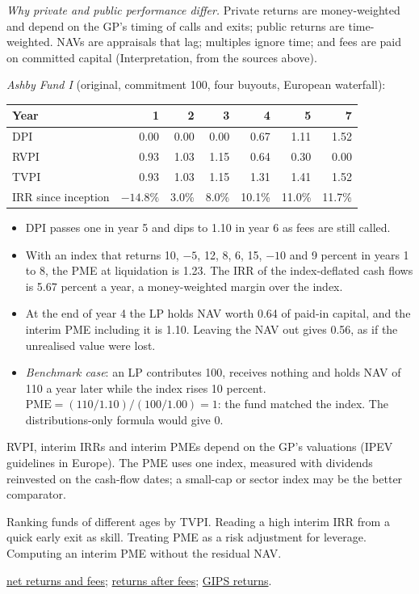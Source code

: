 \begin{qfmethod}
\emph{Why private and public performance differ.} Private returns are money-weighted and depend on the GP's timing of calls and exits; public returns are time-weighted. NAVs are appraisals that lag; multiples ignore time; and fees are paid on committed capital (Interpretation, from the sources above).

 \emph{Ashby Fund I} (original, commitment 100, four buyouts, European waterfall):
\begin{center}\small
\begin{tabular}{@{}lrrrrrr@{}}
\toprule
Year & 1 & 2 & 3 & 4 & 5 & 7 \\
\midrule
DPI & 0.00 & 0.00 & 0.00 & 0.67 & 1.11 & 1.52 \\
RVPI & 0.93 & 1.03 & 1.15 & 0.64 & 0.30 & 0.00 \\
TVPI & 0.93 & 1.03 & 1.15 & 1.31 & 1.41 & 1.52 \\
IRR since inception & $-14.8\%$ & 3.0\% & 8.0\% & 10.1\% & 11.0\% & 11.7\% \\
\bottomrule
\end{tabular}
\end{center}
\begin{itemize}
\item DPI passes one in year 5 and dips to 1.10 in year 6 as fees are still called.
\item With an index that returns 10, $-5$, 12, 8, 6, 15, $-10$ and 9 percent in years 1 to 8, the PME at liquidation is 1.23. The IRR of the index-deflated cash flows is 5.67 percent a year, a money-weighted margin over the index.
\item At the end of year 4 the LP holds NAV worth 0.64 of paid-in capital, and the interim PME including it is 1.10. Leaving the NAV out gives 0.56, as if the unrealised value were lost.
\item \emph{Benchmark case}: an LP contributes 100, receives nothing and holds NAV of 110 a year later while the index rises 10 percent. $\mathrm{PME}=(110/1.10)/(100/1.00)=1$: the fund matched the index. The distributions-only formula would give 0.
\end{itemize}

 RVPI, interim IRRs and interim PMEs depend on the GP's valuations (IPEV guidelines in Europe). The PME uses one index, measured with dividends reinvested on the cash-flow dates; a small-cap or sector index may be the better comparator.

 Ranking funds of different ages by TVPI. Reading a high interim IRR from a quick early exit as skill. Treating PME as a risk adjustment for leverage. Computing an interim PME without the residual NAV.

 \hyperref[meth:gp-alignment-net-returns]{net returns and fees}; \hyperref[meth:alternative-returns-after-fees]{returns after fees}; \hyperref[meth:gips-return-calculations]{GIPS returns}.

\end{qfmethod}

